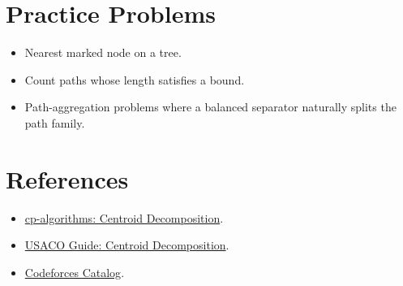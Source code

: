 \section*{Practice Problems}

\begin{itemize}
  \item Nearest marked node on a tree.
  \item Count paths whose length satisfies a bound.
  \item Path-aggregation problems where a balanced separator naturally splits the path family.
\end{itemize}

\section*{References}

\begin{itemize}
  \item \href{https://cp-algorithms.com/graph/centroid_decomposition.html}{cp-algorithms: Centroid Decomposition}.
  \item \href{https://usaco.guide/plat/centroid?lang=cpp}{USACO Guide: Centroid Decomposition}.
  \item \href{https://codeforces.com/catalog}{Codeforces Catalog}.
\end{itemize}
